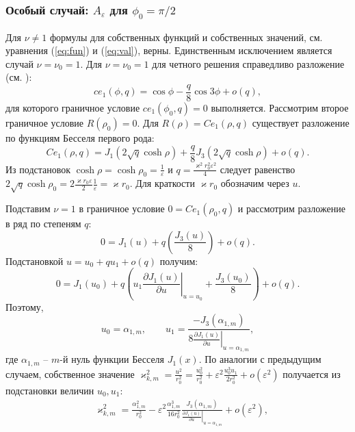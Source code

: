 \subsubsection{Особый случай: $A_\varepsilon$ для $\phi_0=\pi/2$}\label{sec:ch2/sec2/sub1/sub2}


Для $\nu\ne 1$ формулы для собственных функций и собственных значений, см. уравнения (\ref{eq:fun}) и (\ref{eq:val}), верны. Единственным исключением является случай  $\nu=\nu_0=1$.
Для $\nu=\nu_0=1$ для четного решения справедливо разложение (см. \cite[Subsect.~20.2.27]{wref2}):
\begin{equation*}
ce_1(\phi, q) = 	\cos{\phi}  - \frac{q}{8} \cos{3\phi} + o(q),
 \end{equation*}
для которого граничное условие  $ce_1(\phi_0, q)=0$ выполняется. 
Рассмотрим второе граничное условие $R(\rho_0) = 0$.
Для $R(\rho) = Ce_1(\rho, q)$ существует разложение по функциям Бесселя первого рода:
\begin{equation*}
Ce_1(\rho, q) = J_1(2\sqrt{q} \cosh{\rho}) + \frac{q}{8} J_3(2\sqrt{q}\cosh{\rho}) + o(q).
\end{equation*}
Из подстановок $\cosh\rho = \cosh\rho_0 =  \frac{1}{\varepsilon}$ и $q = \frac{\varkappa^2 r_0^2 \varepsilon^2}{4}$ следует равенство
$2\sqrt{q} \cosh{\rho_0} = 2 \frac{\varkappa r_0 \varepsilon}{2} \frac{1}{\varepsilon} = \varkappa r_0$. Для краткости $\varkappa r_0$ обозначим через $u$. 

Подставим $\nu = 1$ в граничное условие $0 = Ce_1(\rho_0, q)$ и рассмотрим разложение в ряд по степеням   $q$:
\begin{equation*}
    0 = J_1(u) + q \left( \frac{J_3(u)}{8} \right) + o(q).
\end{equation*}
Подстановкой  $u = u_0 + q u_1 + o(q)$ получим:
\begin{equation*}
    0 = 
    J_1(u_0) + q \left( 
    u_1 \left.\frac{\partial J_1 (u)}{\partial u}\right|_{u=u_0}
    + \frac{J_3(u_0)}{8}
    \right) + o(q).
\end{equation*}
Поэтому, 
\begin{equation*}
u_0 = \alpha_{1, m}, \qquad u_1 = 
\frac{ - J_3(\alpha_{1, m}) }{8\left.
\frac{\partial J_1 (u)}{\partial u}\right|_{u=\alpha_{1, m}}},
\end{equation*}
где $\alpha_{1, m}$ -- $m$-й нуль функции Бесселя  $J_1(x)$. По аналогии с предыдущим случаем,
собственное значение $\varkappa_{k, m}^2 = \frac{u^2}{r_0^2} = \frac{u_0^2}{r_0^2} + \varepsilon^2 \frac{u_0^3 u_1}{2r_0^2} + o(\varepsilon^2)$ получается из подстановки величин  $u_0, u_1$:
\begin{align}
   & \varkappa_{k, m}^2 = \frac{\alpha_{1, m}^2}{r_0^2} - \varepsilon^2 \frac{\alpha_{1, m}^3}{16r_0^2} 
    \frac{J_3(\alpha_{1, m})}{\left.\frac{\partial J_1 (u)}{\partial u}\right|_{u=\alpha_{1, m}}} 
    + o(\varepsilon^2), \label{eq:valS1}
    \end{align}




